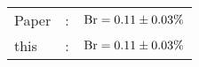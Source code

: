       \begin{tabular}{lcr}
          Paper &:& $\mathrm{Br}  = 0.11\pm 0.03\%$ \\
          this      &:& $\mathrm{Br}  = 0.11\pm 0.03\%$ \\        
      \end{tabular}
